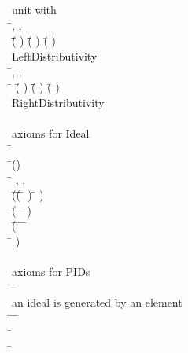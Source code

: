 \begin{hetcasl}
\> {\small{}\KW{\%\%}unit with \Ax{*}}\\
\> \Ax{\forall} \=, ,  \Ax{:}  \\
\> \Ax{\bullet} \=(\= \Ax{+} ) \Ax{*}  \Ax{=} \=(\= \Ax{*} ) \Ax{+} (\= \Ax{*} )\\
\> {\small{}\KW{\%\%}Left\Ax{\_}Distributivity}\\
\> \Ax{\forall} \=, ,  \Ax{:}  \\
\> \Ax{\bullet} \= \Ax{*} (\= \Ax{+} ) \Ax{=} \=(\= \Ax{*} ) \Ax{+} (\= \Ax{*} )\\
\> {\small{}\KW{\%\%}Right\Ax{\_}Distributivity}\\
\> \\
\> {\small{}\KW{\%\%}axioms for Ideal}\\
\> \Ax{\forall} \= \Ax{:}  \\
\> \Ax{\bullet} \=() \\
\>\> \Ax{\Leftrightarrow} \=\Ax{\forall} , ,  \Ax{:}  \\
\>\>\> \Ax{\bullet} \=(\=(\=   \Ax{\Rightarrow} \=  ) \Ax{\wedge} \=  ) \\
\>\>\>\> \Ax{\wedge} (\=   \Ax{\wedge} \=   \Ax{\Rightarrow} \= \Ax{*}   ) \\
\>\>\>\> \Ax{\wedge} (\=   \Ax{\wedge} \=   \Ax{\wedge} \=   \Ax{\wedge} \= \Ax{+}  \Ax{=}  \\
\>\>\>\>\> \Ax{\Rightarrow} \= \Ax{+}   )\\
\> \\
\> {\small{}\KW{\%\%}axioms for PID\Ax{-}s}\\
\> \PRED \=\Ax{\_\_}\Ax{\_\_} \Ax{:} \= \Ax{\times} \\
\>\> {\small{}\KW{\%\%}an ideal is generated by an element}\\
\> \Ax{\forall} \= \Ax{:}  \Ax{\bullet} \=\Ax{\exists}  \Ax{:}  \Ax{\bullet} \=  \\
\> \Ax{\forall} \= \Ax{:}  \\
\> \Ax{\bullet} \=\Ax{\forall}  \Ax{:}  \\

\end{hetcasl}
